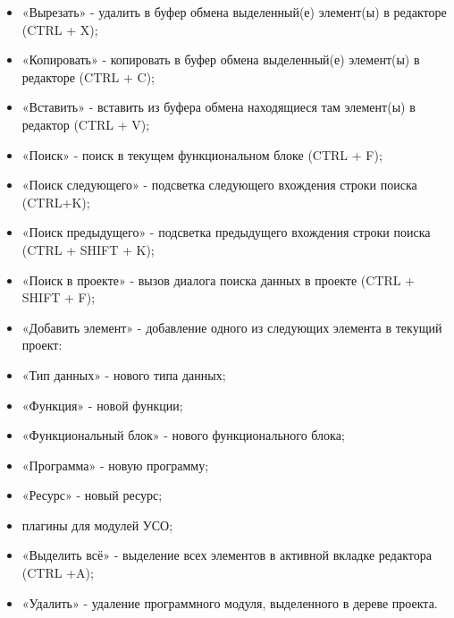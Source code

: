 \documentclass[letterpaper,10pt,russian]{sphinxmanual}
\begin{document}
\begin{itemize}
\item {} 
«Вырезать» - удалить в буфер обмена выделенный(е) элемент(ы) в
редакторе (CTRL + X);

\item {} 
«Копировать» - копировать в буфер обмена выделенный(е) элемент(ы) в
редакторе (CTRL + C);

\item {} 
«Вставить» - вставить из буфера обмена находящиеся там элемент(ы) в
редактор (CTRL + V);

\item {} 
«Поиск» - поиск в текущем функциональном блоке (CTRL + F);

\item {} 
«Поиск следующего» - подсветка следующего вхождения строки поиска
(CTRL+K);

\item {} 
«Поиск предыдущего» - подсветка предыдущего вхождения строки поиска
(CTRL + SHIFT + K);

\item {} 
«Поиск в проекте» - вызов диалога поиска данных в проекте (CTRL +
SHIFT + F);

\item {} 
«Добавить элемент» - добавление одного из следующих элемента в
текущий проект:

\item {} 
«Тип данных» - нового типа данных;

\item {} 
«Функция» - новой функции;

\item {} 
«Функциональный блок» - нового функционального блока;

\item {} 
«Программа» - новую программу;

\item {} 
«Ресурс» - новый ресурс;

\item {} 
плагины для модулей УСО;

\item {} 
«Выделить всё» - выделение всех элементов в активной вкладке
редактора (CTRL +A);

\item {} 
«Удалить» - удаление программного модуля, выделенного в дереве
проекта.

\end{itemize}
\end{document}
